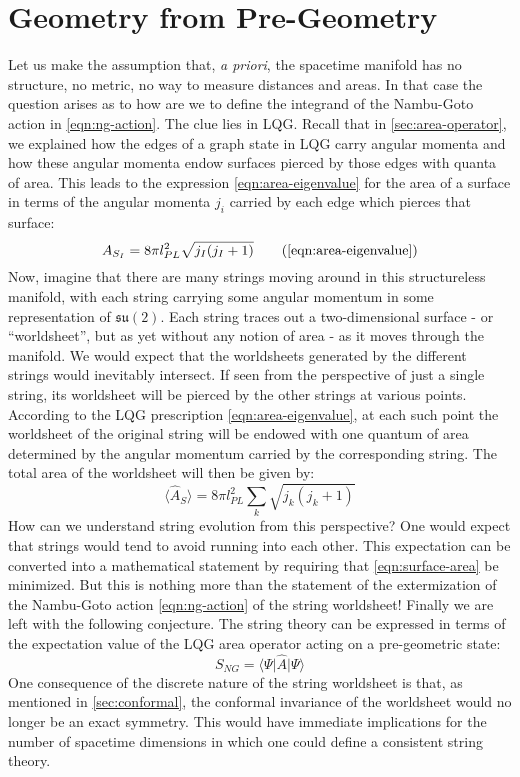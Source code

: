 \documentclass[11pt,a4paper,nofootinbib]{revtex4-1}
\newcommand{\mf}[1]{\mathfrak{#1}}
\newcommand{\expect}[1]{\langle #1\rangle}
\begin{document}
\section{Geometry from Pre-Geometry}\label{sec:pregeom-2}

Let us make the assumption that, \emph{a priori}, the spacetime manifold has no structure, no metric, no way to measure distances and areas. In that case the question arises as to how are we to define the integrand of the Nambu-Goto action in \eqref{eqn:ng-action}. The clue lies in LQG. Recall that in \autoref{sec:area-operator}, we explained how the edges of a graph state in LQG carry angular momenta and how these angular momenta endow surfaces pierced by those edges with quanta of area. This leads to the expression \eqref{eqn:area-eigenvalue} for the area of a surface in terms of the angular momenta $ j_i $ carried by each edge which pierces that surface:
\begin{equation}
	A_{S_I} = 8\pi l^2_{PL} \sqrt{j_I (j_I + 1)} \tag{\ref{eqn:area-eigenvalue}}
\end{equation}
Now, imagine that there are many strings moving around in this structureless manifold, with each string carrying some angular momentum in some representation of $ \mf{su}(2) $. Each string traces out a two-dimensional surface - or ``worldsheet'', but as yet without any notion of area - as it moves through the manifold. We would expect that the worldsheets generated by the different strings would inevitably intersect. If seen from the perspective of just a single string, its worldsheet will be pierced by the other strings at various points. According to the LQG prescription \eqref{eqn:area-eigenvalue}, at each such point the worldsheet of the original string will be endowed with one quantum of area determined by the angular momentum carried by the corresponding string. The total area of the worldsheet will then be given by:
\begin{equation}\label{eqn:surface-area}
		\expect{\hat A_S} = 8 \pi l_{PL}^2 \sum_k \sqrt{ j_k (j_k + 1)}
\end{equation}
How can we understand string evolution from this perspective? One would expect that strings would tend to avoid running into each other. This expectation can be converted into a mathematical statement by requiring that \eqref{eqn:surface-area} be minimized. But this is nothing more than the statement of the extermization of the Nambu-Goto action \eqref{eqn:ng-action} of the string worldsheet! Finally we are left with the following conjecture. The string theory can be expressed in terms of the expectation value of the LQG area operator acting on a pre-geometric state:
\begin{equation}\label{eqn:emergent-action}
	S_{NG} = \expect{\Psi\vert \hat A \vert \Psi}
\end{equation}
One consequence of the discrete nature of the string worldsheet is that, as mentioned in \autoref{sec:conformal}, the conformal invariance of the worldsheet would no longer be an exact symmetry. This would have immediate implications for the number of spacetime dimensions in which one could define a consistent string theory.
\end{document}
